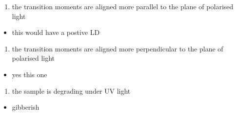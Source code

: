 \documentclass[
]{book}
\providecommand{\tightlist}{%
  \setlength{\itemsep}{0pt}\setlength{\parskip}{0pt}}
\begin{document}
\begin{enumerate}
\def\labelenumi{\alph{enumi}.}
\setcounter{enumi}{4}
\tightlist
\item
  the transition moments are aligned more parallel to the plane of polarised light
\end{enumerate}

\begin{itemize}
\tightlist
\item
  this would have a postive LD
\end{itemize}

\begin{enumerate}
\def\labelenumi{\alph{enumi}.}
\setcounter{enumi}{5}
\tightlist
\item
  the transition moments are aligned more perpendicular to the plane of polarised light
\end{enumerate}

\begin{itemize}
\tightlist
\item
  yes this one
\end{itemize}

\begin{enumerate}
\def\labelenumi{\alph{enumi}.}
\setcounter{enumi}{6}
\tightlist
\item
  the sample is degrading under UV light
\end{enumerate}

\begin{itemize}
\tightlist
\item
  gibberish
\end{itemize}

  
\end{document}
